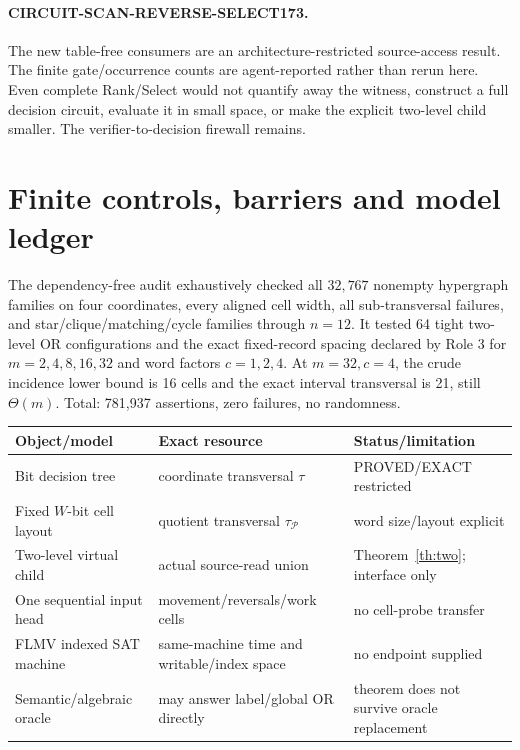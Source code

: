 \documentclass[11pt]{article}
\begin{document}
\paragraph{CIRCUIT-SCAN-REVERSE-SELECT173.}
The new table-free consumers are an architecture-restricted source-access
result.  The finite gate/occurrence counts are agent-reported rather than
rerun here.  Even complete Rank/Select would not quantify away the witness,
construct a full decision circuit, evaluate it in small space, or make the
explicit two-level child smaller.  The verifier-to-decision firewall remains.

\section{Finite controls, barriers and model ledger}
The dependency-free audit exhaustively checked all $32{,}767$ nonempty
hypergraph families on four coordinates, every aligned cell width, all
sub-transversal failures, and star/clique/matching/cycle families through
$n=12$.  It tested 64 tight two-level OR configurations and the exact
fixed-record spacing declared by Role 3 for $m=2,4,8,16,32$ and word factors
$c=1,2,4$.  At $m=32,c=4$, the crude incidence lower bound is 16 cells and
the exact interval transversal is 21, still $\Theta(m)$.  Total: 781,937
assertions, zero failures, no randomness.

\begin{center}\footnotesize
\begin{tabularx}{.95\linewidth}{p{.23\linewidth}p{.21\linewidth}X}
\toprule
Object/model & Exact resource & Status/limitation\\\midrule
Bit decision tree & coordinate transversal $\tau$ & PROVED/EXACT restricted\\
Fixed $W$-bit cell layout & quotient transversal $\tau_{\mathcal P}$ & word size/layout explicit\\
Two-level virtual child & actual source-read union & Theorem~\ref{th:two}; interface only\\
One sequential input head & movement/reversals/work cells & no cell-probe transfer\\
FLMV indexed SAT machine & same-machine time and writable/index space & no endpoint supplied\\
Semantic/algebraic oracle & may answer label/global OR directly & theorem does not survive oracle replacement\\
\bottomrule
\end{tabularx}
\end{center}
\end{document}
